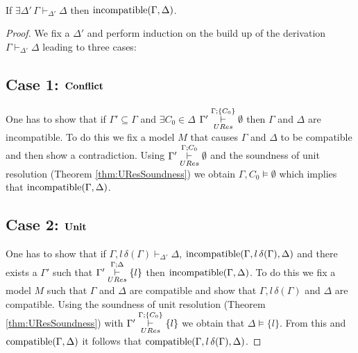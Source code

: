 \begin{mytheorem} \hspace*{0pt} \\
\begin{center}If  $\exists \Delta' \, \Gamma \vdash_{\Delta'} \Delta$  then $\mathrm{incompatible}(\Gamma,\Delta)$. \end{center}
\begin{proof}
We fix a $\Delta'$ and perform induction on the build up of the derivation $\Gamma \vdash_{\Delta'} \Delta$ leading to three cases:
%
\subsection*{Case 1: $\mathbf{Conflict}$}
One has to show that if $\Gamma' \subseteq \Gamma$ and $\exists C_0 \in \Delta$ $\Gamma' \overset{\Gamma;\{ C_0 \}}{\underset{URes}{\vdash}} \emptyset$ then $\Gamma$ and $\Delta$ are incompatible. To do this we fix a model $M$ that causes $\Gamma$ and $\Delta$ to be compatible and then show a contradiction. Using $\Gamma' \overset{\Gamma;C_0}{\underset{URes}{\vdash}} \emptyset$ and the soundness of unit resolution (Theorem \ref{thm:UResSoundness}) we obtain $\Gamma, C_0 \models \emptyset$ which implies that $\mathrm{incompatible}(\Gamma,\Delta)$. 
%
\subsection*{Case 2: $\mathbf{Unit}$}
One has to show that if $\Gamma, l \, \delta(\Gamma) \vdash_{\Delta'} \Delta$, $\mathrm{incompatible}(\Gamma,l \, \delta(\Gamma),\Delta)$ and there exists a $\Gamma'$ such that  $\Gamma' \overset{\Gamma;\Delta}{\underset{URes}{\vdash}} \{ l \}$ then $\mathrm{incompatible}(\Gamma,\Delta)$. To do this we fix a model $M$ such that $\Gamma$ and $\Delta$ are compatible and show that $\Gamma, l \, \delta(\Gamma)$ and $\Delta$ are compatible. Using the soundness of unit resolution (Theorem \ref{thm:UResSoundness}) with $\Gamma' \overset{\Gamma;\{ C_0\}}{\underset{URes}{\vdash}} \{ l \}$ we obtain that $\Delta \models \{l\}$. From this and $\mathrm{compatible}(\Gamma,\Delta)$ it follows that $\mathrm{compatible}(\Gamma, l \, \delta(\Gamma),\Delta)$.



\end{proof}
\end{mytheorem}
